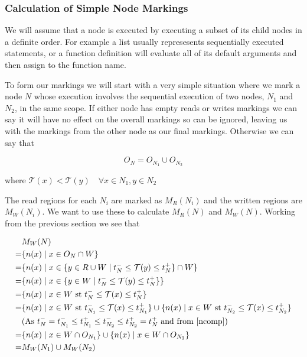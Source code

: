 \documentclass{report}
\begin{document}
\subsubsection{Calculation of Simple Node Markings}

We will assume that a node is executed by executing a subset of its child nodes in a definite order. For example a list usually represesents
sequentially executed statements, or a function definition will evaluate all of its default arguments and then assign to the function name.

To form our markings we will start with a very simple situation where we mark a node $N$ whose execution involves the sequential execution of two nodes,
$N_1$ and $N_2$, in the same scope. If either node has empty reads or writes markings we can say it will have no effect on the overall markings so can be ignored,
leaving us with the markings from the other node as our final markings. Otherwise we can say that

\begin{equation}\label{ncomp}
O_N = O_{N_1} \cup O_{N_2}
\end{equation}

where $\mathcal{T}(x) < \mathcal{T}(y) \quad \forall x \in N_1, y \in N_2$

The read regions for each $N_i$ are marked as $M_R(N_i)$ and the written regions are $M_W(N_i)$. We want to use these to calculate $M_R(N)$ and $M_W(N)$. Working
from the previous section we see that

\begin{align*}
& M_W(N) \\
=& \{ n(x) \mid x \in O_N \cap W \} \\
=& \{ n(x) \mid x \in \{y \in R \cup W \mid t^{-}_N \le \mathcal{T}(y) \le t^+_N \} \cap W \} \\
=& \{ n(x) \mid x \in \{y \in W \mid t^{-}_N \le \mathcal{T}(y) \le t^+_N \} \} \\
=& \{ n(x) \mid x \in W \text{ st } t^{-}_N \le \mathcal{T}(x) \le t^+_N \} \\
=& \{ n(x) \mid x \in W \text{ st } t^{-}_{N_1} \le \mathcal{T}(x) \le t^+_{N_1} \} \cup
   \{ n(x) \mid x \in W \text{ st } t^{-}_{N_2} \le \mathcal{T}(x) \le t^+_{N_2} \} \\
&  \text{(As } t^-_N = t^-_{N_1} \le t^+_{N_1} \le t^-_{N_2} \le t^+_{N_2} = t^+_N \text{ and from \eqref{ncomp})} \\
=& \{ n(x) \mid x \in W \cap O_{N_1} \} \cup \{ n(x) \mid x \in W \cap O_{N_2} \} \\
=& M_W(N_1) \cup M_W(N_2)
\end{align*}
\end{document}

